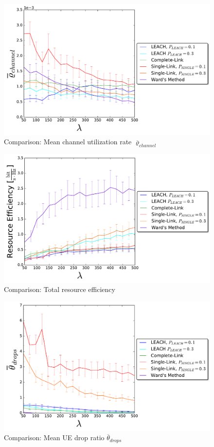 \begin{figure}
\centering
\captionsetup{justification=centering}
\includegraphics[width=1\linewidth]{figures/COMPARE_8}
\caption{Comparison: Mean channel utilization rate $\overline{\varrho}_{channel}$}
\label{fig:COMPARE_8}
\end{figure}

\begin{figure}
\centering
\captionsetup{justification=centering}
\includegraphics[width=1\linewidth]{figures/COMPARE_9}
\caption{Comparison: Total resource efficiency}
\label{fig:COMPARE_9}
\end{figure}

\begin{figure}
\centering
\captionsetup{justification=centering}
\includegraphics[width=1\linewidth]{figures/COMPARE_10}
\caption{Comparison: Mean UE drop ratio $\overline{\theta}_{drops}$}
\label{fig:COMPARE_10}
\end{figure}
